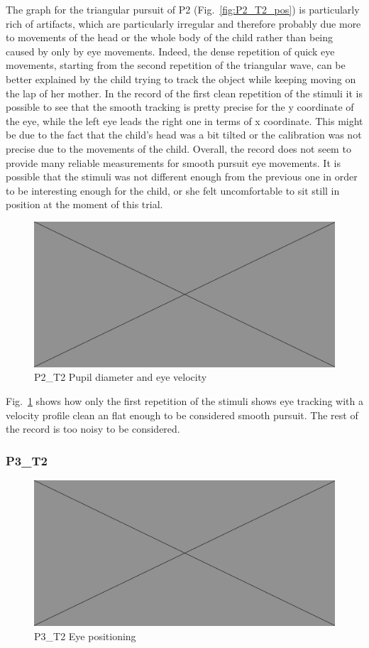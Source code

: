 The graph for the triangular pursuit of P2 (Fig.~\ref{fig:P2_T2_pos})  is particularly rich of artifacts, which are particularly irregular and therefore probably due more to movements of the head or the whole body of the child rather than being caused by only by eye movements. Indeed, the dense repetition of quick eye movements, starting from the second repetition of the triangular wave, can be better explained by the child trying to track the object while keeping moving on the lap of her mother. In the record of the first clean repetition of the stimuli it is possible to see that the smooth tracking is pretty precise for the y coordinate of the eye, while the left eye leads the right one in terms of x coordinate. This might be due to the fact that the child’s head was a bit tilted or the calibration was not precise due to the movements of the child. Overall, the record does not seem to provide many reliable measurements for smooth pursuit eye movements. It is possible that the stimuli was not different enough from the previous one in order to be interesting enough for the child, or she felt uncomfortable to sit still in position at the moment of this trial.

\begin{figure}[h]
  \centering
  \includegraphics[width=.5\textwidth]{figures/placeholderImg.jpg}
  \caption[P2\_T2 pupil velocity]{P2\_T2 Pupil diameter and eye velocity}
  \label{fig:P2_T2_vel}
\end{figure}

Fig.~\ref{fig:P2_T2_vel} shows how only the first repetition of the stimuli shows eye tracking with a velocity profile clean an flat enough to be considered smooth pursuit. The rest of the record is too noisy to be considered.




\subsubsection{P3\_T2}
\label{sec:P3_T2}

\begin{figure}[h]
  \centering
  \includegraphics[width=.5\textwidth]{figures/placeholderImg.jpg}
  \caption[P3\_T2 Eye positioning]{P3\_T2 Eye positioning}
  \label{fig:P3_T2_pos}
\end{figure}


